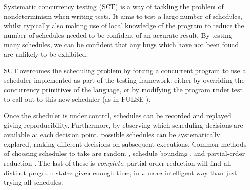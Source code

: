 Systematic concurrency testing (SCT) \citep{dpor, pbound, heisenbugs,
  empirical} is a way of tackling the problem of nondeterminism when
writing tests. It aims to test a large number of schedules, whilst
typically also making use of local knowledge of the program to reduce
the number of schedules needed to be confident of an accurate
result. By testing many schedules, we can be confident that any bugs
which have not been found are unlikely to be exhibited.

SCT overcomes the scheduling problem by forcing a concurrent program
to use a scheduler implemented as part of the testing framework:
either by overriding the concurrency primitives of the language, or by
modifying the program under test to call out to this new scheduler (as
in PULSE \citep{pulse}).

Once the scheduler is under control, schedules can be recorded and
replayed, giving reproducibility. Furthermore, by observing which
scheduling decisions are available at each decision point, possible
schedules can be systematically explored, making different decisions
on subsequent executions. Common methods of choosing schedules to take
are random \citep{empirical}, schedule bounding \citep{pbound}, and
partial-order reduction \citep{dpor}. The last of these is
\emph{complete}: partial-order reduction will find all distinct
program states given enough time, in a more intelligent way than just
trying all schedules.
